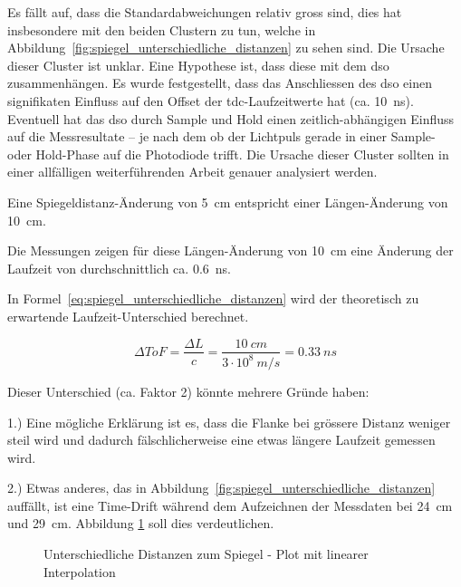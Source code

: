 Es fällt auf, dass die Standardabweichungen relativ gross sind, dies hat insbesondere mit den beiden Clustern zu tun,
welche in Abbildung~\ref{fig:spiegel_unterschiedliche_distanzen} zu sehen sind. Die Ursache dieser Cluster ist unklar.
Eine Hypothese ist, dass diese mit dem \acrshort{dso} zusammenhängen. Es wurde festgestellt, dass das Anschliessen des
\acrshort{dso} einen signifikaten Einfluss auf den Offset der \acrshort{tdc}-Laufzeitwerte hat (ca. 10~ns). Eventuell
hat das \acrshort{dso} durch Sample und Hold einen zeitlich-abhängigen Einfluss auf die Messresultate -- je nach dem ob
der Lichtpuls gerade in einer Sample- oder Hold-Phase auf die Photodiode trifft. Die Ursache dieser Cluster sollten in
einer allfälligen weiterführenden Arbeit genauer analysiert werden.

Eine Spiegeldistanz-Änderung von 5~cm entspricht einer Längen-Änderung von 10~cm.

Die Messungen zeigen für diese Längen-Änderung von 10~cm eine Änderung der Laufzeit von durchschnittlich ca. 0.6~ns.

In Formel~\ref{eq:spiegel_unterschiedliche_distanzen} wird der theoretisch zu erwartende Laufzeit-Unterschied berechnet.

\begin{equation}\label{eq:spiegel_unterschiedliche_distanzen}
    \Delta ToF = \frac{\Delta L}{c} = \frac{10~cm}{3 \cdot 10^8~m/s} = 0.33~ns
\end{equation}


Dieser Unterschied (ca. Faktor 2) könnte mehrere Gründe haben:

1.) Eine mögliche Erklärung ist es, dass die Flanke bei
grössere Distanz weniger steil wird und dadurch fälschlicherweise eine etwas längere Laufzeit gemessen wird.

2.) Etwas anderes, das in Abbildung~\ref{fig:spiegel_unterschiedliche_distanzen} auffällt, ist eine Time-Drift während
dem Aufzeichnen der Messdaten bei 24~cm und 29~cm. Abbildung \ref{fig:spiegel_unterschiedliche_distanzen_linear} soll
dies verdeutlichen.

\begin{figure}[H]
    \centering
    
    \caption{Unterschiedliche Distanzen zum Spiegel - Plot mit linearer Interpolation}\label{fig:spiegel_unterschiedliche_distanzen_linear}
\end{figure}

